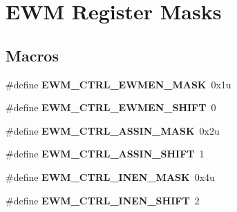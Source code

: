 \hypertarget{group___e_w_m___register___masks}{}\section{E\+W\+M Register Masks}
\label{group___e_w_m___register___masks}
\subsection*{Macros}
\begin{DoxyCompactItemize}
\item 
\hypertarget{group___e_w_m___register___masks_ga7426f0a484ad28b92efb90ef0e3f01fd}{}\#define {\bfseries E\+W\+M\+\_\+\+C\+T\+R\+L\+\_\+\+E\+W\+M\+E\+N\+\_\+\+M\+A\+S\+K}~0x1u\label{group___e_w_m___register___masks_ga7426f0a484ad28b92efb90ef0e3f01fd}

\item 
\hypertarget{group___e_w_m___register___masks_gafac96f184ce423d5872e0ca6e258d004}{}\#define {\bfseries E\+W\+M\+\_\+\+C\+T\+R\+L\+\_\+\+E\+W\+M\+E\+N\+\_\+\+S\+H\+I\+F\+T}~0\label{group___e_w_m___register___masks_gafac96f184ce423d5872e0ca6e258d004}

\item 
\hypertarget{group___e_w_m___register___masks_ga24fe6289cbd9e813f99fb721d28b7bb5}{}\#define {\bfseries E\+W\+M\+\_\+\+C\+T\+R\+L\+\_\+\+A\+S\+S\+I\+N\+\_\+\+M\+A\+S\+K}~0x2u\label{group___e_w_m___register___masks_ga24fe6289cbd9e813f99fb721d28b7bb5}

\item 
\hypertarget{group___e_w_m___register___masks_gac397960fb320e62f5c89e057e9f5ce13}{}\#define {\bfseries E\+W\+M\+\_\+\+C\+T\+R\+L\+\_\+\+A\+S\+S\+I\+N\+\_\+\+S\+H\+I\+F\+T}~1\label{group___e_w_m___register___masks_gac397960fb320e62f5c89e057e9f5ce13}

\item 
\hypertarget{group___e_w_m___register___masks_ga4366a1e4b346e8a61898588faa0ca7df}{}\#define {\bfseries E\+W\+M\+\_\+\+C\+T\+R\+L\+\_\+\+I\+N\+E\+N\+\_\+\+M\+A\+S\+K}~0x4u\label{group___e_w_m___register___masks_ga4366a1e4b346e8a61898588faa0ca7df}

\item 
\hypertarget{group___e_w_m___register___masks_ga64cbcf45aac428b81d2ed6aab3cd0fe2}{}\#define {\bfseries E\+W\+M\+\_\+\+C\+T\+R\+L\+\_\+\+I\+N\+E\+N\+\_\+\+S\+H\+I\+F\+T}~2\label{group___e_w_m___register___masks_ga64cbcf45aac428b81d2ed6aab3cd0fe2}


\end{DoxyCompactItemize}
